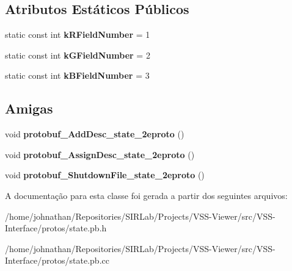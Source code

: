 \subsection*{Atributos Estáticos Públicos}
\begin{DoxyCompactItemize}
\item 
static const int {\bfseries k\+R\+Field\+Number} = 1\hypertarget{classvss__state_1_1RGB_a6b14019e7583f983a0dc0e0c713767e5}{}\label{classvss__state_1_1RGB_a6b14019e7583f983a0dc0e0c713767e5}

\item 
static const int {\bfseries k\+G\+Field\+Number} = 2\hypertarget{classvss__state_1_1RGB_a7f4f93a87024582ed9aa94ad501aacc0}{}\label{classvss__state_1_1RGB_a7f4f93a87024582ed9aa94ad501aacc0}

\item 
static const int {\bfseries k\+B\+Field\+Number} = 3\hypertarget{classvss__state_1_1RGB_a2c4583771ba2ee5b0f6798c7ee082b3e}{}\label{classvss__state_1_1RGB_a2c4583771ba2ee5b0f6798c7ee082b3e}

\end{DoxyCompactItemize}
\subsection*{Amigas}
\begin{DoxyCompactItemize}
\item 
void {\bfseries protobuf\+\_\+\+Add\+Desc\+\_\+state\+\_\+2eproto} ()\hypertarget{classvss__state_1_1RGB_aab1a2c258f8122a403a979ff57e2a706}{}\label{classvss__state_1_1RGB_aab1a2c258f8122a403a979ff57e2a706}

\item 
void {\bfseries protobuf\+\_\+\+Assign\+Desc\+\_\+state\+\_\+2eproto} ()\hypertarget{classvss__state_1_1RGB_a57d9367bc8a7a94ead11d11194cca1b6}{}\label{classvss__state_1_1RGB_a57d9367bc8a7a94ead11d11194cca1b6}

\item 
void {\bfseries protobuf\+\_\+\+Shutdown\+File\+\_\+state\+\_\+2eproto} ()\hypertarget{classvss__state_1_1RGB_a4e6dc5e8e72799859c4e9556d090e57d}{}\label{classvss__state_1_1RGB_a4e6dc5e8e72799859c4e9556d090e57d}

\end{DoxyCompactItemize}


A documentação para esta classe foi gerada a partir dos seguintes arquivos\+:\begin{DoxyCompactItemize}
\item 
/home/johnathan/\+Repositories/\+S\+I\+R\+Lab/\+Projects/\+V\+S\+S-\/\+Viewer/src/\+V\+S\+S-\/\+Interface/protos/state.\+pb.\+h\item 
/home/johnathan/\+Repositories/\+S\+I\+R\+Lab/\+Projects/\+V\+S\+S-\/\+Viewer/src/\+V\+S\+S-\/\+Interface/protos/state.\+pb.\+cc\end{DoxyCompactItemize}
